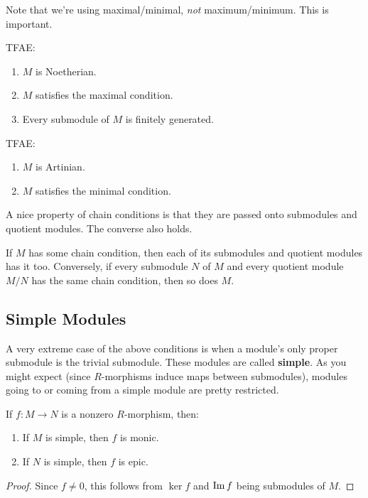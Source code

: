 \documentclass[twoside,10pt]{report}
\begin{document}
Note that we're using maximal/minimal, \textit{not} maximum/minimum. This is important.

\begin{thrm}[]
	TFAE:
	\begin{enumerate}
		\item $M$ is Noetherian.
		\item $M$ satisfies the maximal condition.
		\item Every submodule of $M$ is finitely generated.
	\end{enumerate}
\end{thrm}

\begin{thrm}[]
TFAE:
\begin{enumerate}
	\item $M$ is Artinian.
	\item $M$ satisfies the minimal condition.
\end{enumerate}
\end{thrm}

A nice property of chain conditions is that they are passed onto submodules and quotient modules. The converse also holds.
\begin{prop}
If $M$ has some chain condition, then each of its submodules and quotient modules has it too. Conversely, if every submodule $N$ of $M$ and every quotient module $M/N$ has the same chain condition, then so does $M$.
\end{prop}

\subsection{Simple Modules}

A very extreme case of the above conditions is when a module's only proper submodule is the trivial submodule. These modules are called \textbf{simple}. As you might expect (since $R$-morphisms induce maps between submodules), modules going to or coming from a simple module are pretty restricted.

\begin{prop}
If $f:M\to N$ is a nonzero $R$-morphism, then:
\begin{enumerate}
	\item If $M$ is simple, then $f$ is monic.
	\item If $N$ is simple, then $f$ is epic.
\end{enumerate}
\end{prop}
\begin{proof}
	Since $f \neq 0$, this follows from $\ker f$ and $\operatorname{Im} f$ being submodules of $M$.
\end{proof}
\end{document}
